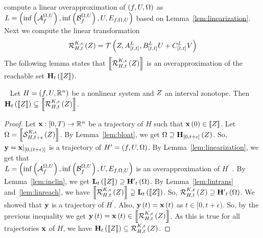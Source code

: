 compute a linear overapproximation of $\left(f,U,\Omega\right)$ as\\ $L
= \left(\inf\left(\mathcal{A}_{f}^{\Omega,U}\right),
\inf\left(\mathcal{B}_{f}^{\Omega,U}\right),
U,
E_{f,\Omega,U}
\right)$ based on Lemma~\ref{lem:linearization}.  Next we compute the linear transformation
%
\[
\mathcal{R}_{H,t}^{K,\epsilon}\left(Z\right)
= \mathcal{T}\left(Z, {A}^{L}_{[t,t]},{B}^{L}_{[t,t]}U
+ {C}^{L}_{[t,t]}V \right)
\]
%
The following lemma states that $\left\llbracket{\mathcal{R}_{H,t}^{K,\epsilon}\left(Z\right)
}\right\rrbracket$ is an overapproximation of the reachable set
$\mathbf{H}_{t}\left(\left\llbracket{Z}\right\rrbracket\right)$.
%
\begin{lemma}~\label{lem:reachnonlin}
Let $H = \left(f,U,\mathbb{R}^n\right)$ be a nonlinear system and $Z$ an
interval zonotope.  Then
$\mathbf{H}_{t}\left(\left\llbracket{Z}\right\rrbracket\right) \subseteq \left\llbracket{\mathcal{R}_{H,t}^{K,\epsilon}\left(Z\right)}\right\rrbracket$.
\end{lemma}
%
\begin{proof}
Let $\mathbf{x}:[0,T)\rightarrow \mathbb{R}^n$ be a trajectory of $H$ such
that $\mathbf{x}\left(0\right)\in\left\llbracket{Z}\right\rrbracket$.  Let $\Omega
= \left\llbracket{\mathcal{S}_{H,t+\epsilon}^{K,\epsilon}\left(Z\right)}\right\rrbracket$.  By
Lemma~\ref{lem:bloat}, we get $\Omega\supseteq\mathbf{H}_{[0,t+\epsilon]}\left(Z\right)$.  So,
$\mathbf{y} = \mathbf{x}|_{[0,(t+\epsilon)]}$ is a trajectory of $H^\prime
= \left(f,U,\Omega\right)$.  By Lemma~\ref{lem:linearization}, we get that\\ $L
= \left(\inf\left(\mathcal{A}_{f}^{\Omega,U}\right),
\inf\left(\mathcal{B}_{f}^{\Omega,U}\right),
U,
E_{f,\Omega,U}
\right)$ is an overapproximation of $H^\prime$ .  By Lemma~\ref{lem:inclin},
we get
$\mathbf{L}_{t}\left(\left\llbracket{Z}\right\rrbracket\right)\supseteq\mathbf{H^\prime}_{t}\left(\Omega\right)$.  By
Lemma~\ref{lem:lintrans} and~\ref{lem:linreach}, we have
$\left\llbracket{\mathcal{R}_{H,t}^{K,\epsilon}\left(Z\right)}\right\rrbracket \supseteq \mathbf{L}_{t}\left(\left\llbracket{Z}\right\rrbracket\right)$.
So,
$\mathcal{R}_{H,t}^{K,\epsilon}\left(Z\right)\supseteq\mathbf{H^\prime}_{t}\left(\Omega\right)$.
We showed that $\mathbf{y}$ is a trajectory of $H^\prime$. Also,
$\mathbf{y}\left(t\right) =\mathbf{x}\left(t\right)$ as $t\in[0,t+\epsilon)$.  So, by the previous
inequality we get $\mathbf{y}\left(t\right)
= \mathbf{x}\left(t\right)\in\left\llbracket{\mathcal{R}_{H,t}^{K,\epsilon}\left(Z\right)}\right\rrbracket$.  As this is true
for all trajectories $\mathbf{x}$ of $H$, we have
$\mathbf{H}_{t}\left(\left\llbracket{Z}\right\rrbracket\right)\subseteq\mathcal{R}_{H,t}^{K,\epsilon}\left(Z\right)$.
\end{proof}
%
